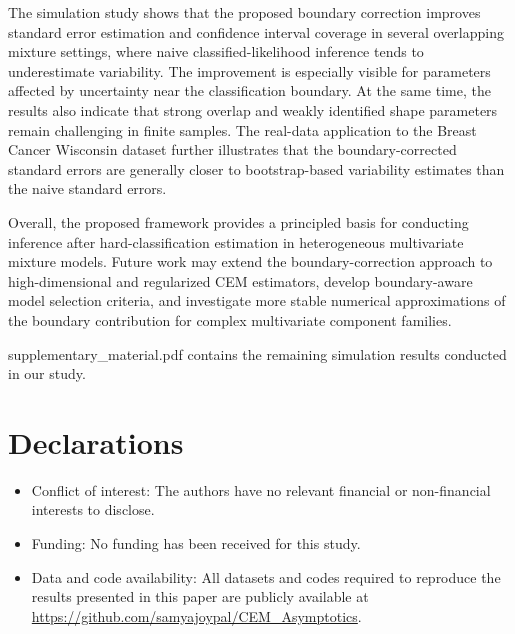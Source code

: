 \documentclass[pdflatex,sn-mathphys-ay]{sn-jnl}%
\theoremstyle{thmstyleone}%
\theoremstyle{thmstyletwo}%
\theoremstyle{thmstylethree}%
\begin{document}
The simulation study shows that the proposed boundary correction improves standard error estimation and confidence interval coverage in several overlapping mixture settings, where naive classified-likelihood inference tends to underestimate variability. The improvement is especially visible for parameters affected by uncertainty near the classification boundary. At the same time, the results also indicate that strong overlap and weakly identified shape parameters remain challenging in finite samples. The real-data application to the Breast Cancer Wisconsin dataset further illustrates that the boundary-corrected standard errors are generally closer to bootstrap-based variability estimates than the naive standard errors.

Overall, the proposed framework provides a principled basis for conducting inference after hard-classification estimation in heterogeneous multivariate mixture models. Future work may extend the boundary-correction approach to high-dimensional and regularized CEM estimators, develop boundary-aware model selection criteria, and investigate more stable numerical approximations of the boundary contribution for complex multivariate component families.

\backmatter


supplementary\_material.pdf contains the remaining simulation results conducted in our study.




\section*{Declarations}

\begin{itemize}
\item Conflict of interest: The authors have no relevant financial or non-financial interests to disclose.
\item Funding: No funding has been received for this study.
\item Data and code availability: All datasets and codes required to reproduce the results presented in this paper are publicly available at \url{https://github.com/samyajoypal/CEM_Asymptotics}.
\end{itemize}
\noindent
\end{document}
